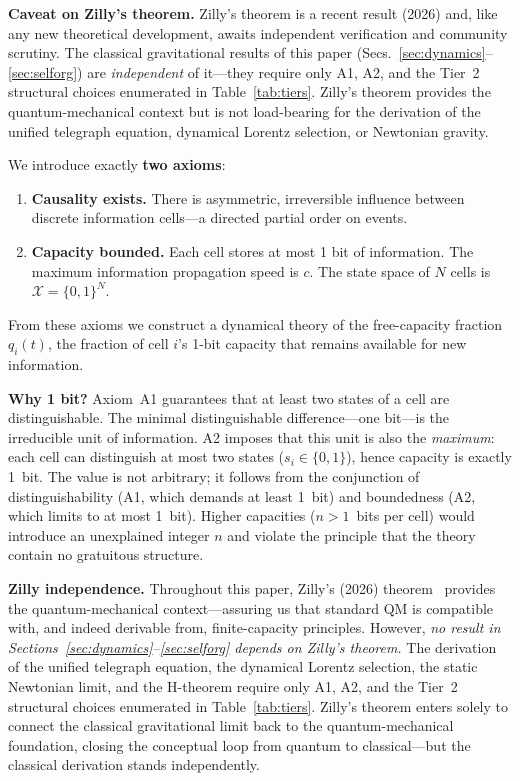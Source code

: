 \documentclass[aps,prd,twocolumn,showpacs,superscriptaddress,preprintnumbers]{revtex4-2}
\begin{document}
\textbf{Caveat on Zilly's theorem.}
Zilly's theorem is a recent result (2026) and, like any new theoretical development, awaits independent verification and community scrutiny.
The classical gravitational results of this paper (Secs.~\ref{sec:dynamics}--\ref{sec:selforg}) are \emph{independent} of it---they require only A1, A2, and the Tier~2 structural choices enumerated in Table~\ref{tab:tiers}.
Zilly's theorem provides the quantum-mechanical context but is not load-bearing for the derivation of the unified telegraph equation, dynamical Lorentz selection, or Newtonian gravity.

We introduce exactly \textbf{two axioms}:

\begin{enumerate}
    \item[A1.] \textbf{Causality exists.} There is asymmetric, irreversible influence between discrete information cells---a directed partial order on events.
    \item[A2.] \textbf{Capacity bounded.} Each cell stores at most 1 bit of information. The maximum information propagation speed is $c$. The state space of $N$ cells is $\mathcal{X}=\{0,1\}^N$.
\end{enumerate}

From these axioms we construct a dynamical theory of the free-capacity fraction $q_i(t)$, the fraction of cell $i$'s 1-bit capacity that remains available for new information.

\textbf{Why 1 bit?} Axiom~A1 guarantees that at least two states of a cell are distinguishable. The minimal distinguishable difference---one bit---is the irreducible unit of information.
A2 imposes that this unit is also the \emph{maximum}: each cell can distinguish at most two states ($s_i\in\{0,1\}$), hence capacity is exactly 1~bit.
The value is not arbitrary; it follows from the conjunction of distinguishability (A1, which demands at least 1~bit) and boundedness (A2, which limits to at most 1~bit).
Higher capacities ($n>1$~bits per cell) would introduce an unexplained integer $n$ and violate the principle that the theory contain no gratuitous structure.

\textbf{Zilly independence.} Throughout this paper, Zilly's (2026) theorem~\cite{Zilly:2026} provides the quantum-mechanical context---assuring us that standard QM is compatible with, and indeed derivable from, finite-capacity principles.
However, \emph{no result in Sections~\ref{sec:dynamics}--\ref{sec:selforg} depends on Zilly's theorem.}
The derivation of the unified telegraph equation, the dynamical Lorentz selection, the static Newtonian limit, and the H-theorem require only A1, A2, and the Tier~2 structural choices enumerated in Table~\ref{tab:tiers}.
Zilly's theorem enters solely to connect the classical gravitational limit back to the quantum-mechanical foundation, closing the conceptual loop from quantum to classical---but the classical derivation stands independently.
\end{document}
